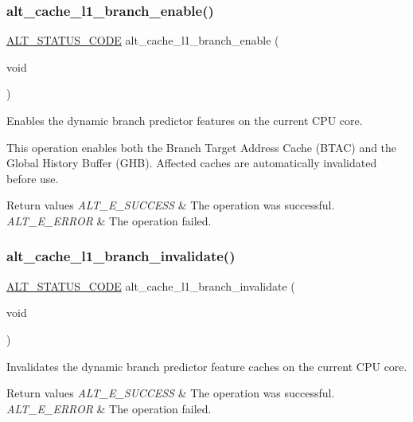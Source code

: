\subsubsection{\texorpdfstring{alt\_cache\_l1\_branch\_enable()}{alt\_cache\_l1\_branch\_enable()}}
{\footnotesize\ttfamily \mbox{\hyperlink{hwlib_8h_abdb0d369f069723ca55d6c94bcaaaa12}{A\+L\+T\+\_\+\+S\+T\+A\+T\+U\+S\+\_\+\+C\+O\+DE}} alt\+\_\+cache\+\_\+l1\+\_\+branch\+\_\+enable (\begin{DoxyParamCaption}\item[{void}]{ }\end{DoxyParamCaption})}

Enables the dynamic branch predictor features on the current C\+PU core.

This operation enables both the Branch Target Address Cache (B\+T\+AC) and the Global History Buffer (G\+HB). Affected caches are automatically invalidated before use.


\begin{DoxyRetVals}{Return values}
{\em A\+L\+T\+\_\+\+E\+\_\+\+S\+U\+C\+C\+E\+SS} & The operation was successful. \\
\hline
{\em A\+L\+T\+\_\+\+E\+\_\+\+E\+R\+R\+OR} & The operation failed. \\
\hline
\end{DoxyRetVals}
\mbox{\label{group__CACHE__L1_gaad63482f604077274c24e6210885dc83}} 
\subsubsection{\texorpdfstring{alt\_cache\_l1\_branch\_invalidate()}{alt\_cache\_l1\_branch\_invalidate()}}
{\footnotesize\ttfamily \mbox{\hyperlink{hwlib_8h_abdb0d369f069723ca55d6c94bcaaaa12}{A\+L\+T\+\_\+\+S\+T\+A\+T\+U\+S\+\_\+\+C\+O\+DE}} alt\+\_\+cache\+\_\+l1\+\_\+branch\+\_\+invalidate (\begin{DoxyParamCaption}\item[{void}]{ }\end{DoxyParamCaption})}

Invalidates the dynamic branch predictor feature caches on the current C\+PU core.


\begin{DoxyRetVals}{Return values}
{\em A\+L\+T\+\_\+\+E\+\_\+\+S\+U\+C\+C\+E\+SS} & The operation was successful. \\
\hline
{\em A\+L\+T\+\_\+\+E\+\_\+\+E\+R\+R\+OR} & The operation failed. \\
\hline
\end{DoxyRetVals}
\mbox{\label{group__CACHE__L1_ga832720675bd1ff338b73479cf94b244c}} 
